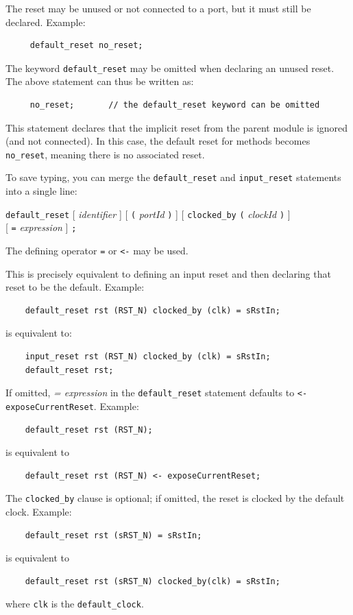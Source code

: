 \documentclass[twoside,letterpaper]{article}
\newcommand{\hm}{\hspace*{1em}}
\newcommand{\te}[1]{\texttt{#1}}
\newcommand{\nterm}[1]{\emph{#1}}
\newcommand{\term}[1]{\texttt{#1}}
\newcommand{\opt}[1]{[ #1 ]}
\newcommand{\gram}[2]{    \hm\makebox[10em][l]{\it #1}\makebox[1.5em][l]{::=}    #2}
\newcommand{\grammore}[1]{\hm\makebox[10em][l]{      }\makebox[1.5em][l]{}       #1}
\begin{document}
The reset may be unused or not connected to a port, but it must still
be  declared.  Example:
\begin{verbatim}
     default_reset no_reset;
\end{verbatim}
The keyword \te{default\_reset} may be omitted when declaring an unused
reset.  The above statement  can thus be written as:
\begin{verbatim}
     no_reset;       // the default_reset keyword can be omitted
\end{verbatim}
This statement declares that the implicit reset from the parent module
is ignored (and not connected).  In this case, the default reset for
methods becomes  \te{no\_reset}, meaning there is no associated reset.

To save typing, you can merge the \te{default\_reset} and
\te{input\_reset} statements into a single line:

\gram{defaultResetBVIStmt}  {\term{default\_reset} \opt{\nterm{identifier}} \opt{\term{(} \nterm{portId}
       \term{)}}  \opt{\term{clocked\_by} \term{(} \nterm{clockId} \term{)}}}\\
\grammore       {\opt{\term{=} \nterm{expression}} \term{;}}

The defining operator \te{=} or \te{<-} may be used.

This is precisely equivalent to defining an input reset and then
declaring that reset to be the default.  Example:
\begin{verbatim}
    default_reset rst (RST_N) clocked_by (clk) = sRstIn;
\end{verbatim}
is equivalent to:
\begin{verbatim}
    input_reset rst (RST_N) clocked_by (clk) = sRstIn;
    default_reset rst;
\end{verbatim}


If omitted, \nterm{= expression} in the \te{default\_reset} statement
defaults  to \texttt{<- exposeCurrentReset}.  Example:
\begin{verbatim}
    default_reset rst (RST_N);
\end{verbatim}
is equivalent to
\begin{verbatim}
    default_reset rst (RST_N) <- exposeCurrentReset;
\end{verbatim}

The \te{clocked\_by} clause is optional; if  omitted, the reset
is clocked by the default clock.  Example:
\begin{verbatim}
    default_reset rst (sRST_N) = sRstIn;
\end{verbatim} 
is equivalent to
\begin{verbatim}
    default_reset rst (sRST_N) clocked_by(clk) = sRstIn;
\end{verbatim}
where \te{clk} is the   \te{default\_clock}.
\end{document}

